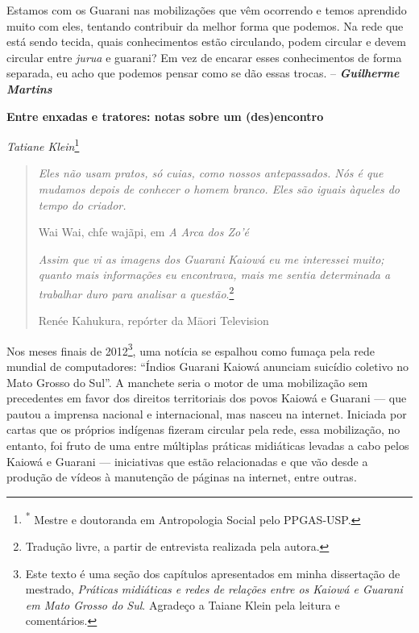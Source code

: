 Estamos com os Guarani nas mobilizações que vêm ocorrendo e temos
aprendido muito com eles, tentando contribuir da melhor forma que
podemos. Na rede que está sendo tecida, quais conhecimentos estão
circulando, podem circular e devem circular entre \emph{jurua} e
guarani? Em vez de encarar esses conhecimentos de forma separada, eu
acho que podemos pensar como se dão essas trocas. --
\emph{\textbf{Guilherme Martins}}

\textbf{Entre enxadas e tratores: notas sobre um (des)encontro}

\emph{Tatiane Klein}\footnote{\textsuperscript{*} Mestre e doutoranda em
  Antropologia Social pelo PPGAS-USP.}

\begin{quote}
\emph{Eles não usam pratos, só cuias, como nossos antepassados. Nós é
que mudamos depois de conhecer o homem branco. Eles são iguais àqueles
do tempo do criador.}

Wai Wai, chfe wajãpi, em \emph{A Arca dos Zo'é}

\emph{Assim que vi as imagens dos Guarani Kaiowá eu me interessei muito;
quanto mais informações eu encontrava, mais me sentia determinada a
trabalhar duro para analisar a questão}.\footnote{Tradução livre, a
  partir de entrevista realizada pela autora.}

Renée Kahukura, repórter da Māori Television
\end{quote}

Nos meses finais de 2012\footnote{Este texto é uma seção dos capítulos
  apresentados em minha dissertação de mestrado, \emph{Práticas
  midiáticas e redes de relações entre os Kaiowá e Guarani em Mato
  Grosso do Sul}. Agradeço a Taiane Klein pela leitura e comentários.},
uma notícia se espalhou como fumaça pela rede mundial de computadores:
``Índios Guarani Kaiowá anunciam suicídio coletivo no Mato Grosso do
Sul''. A manchete seria o motor de uma mobilização sem precedentes em
favor dos direitos territoriais dos povos Kaiowá e Guarani --- que
pautou a imprensa nacional e internacional, mas nasceu na internet.
Iniciada por cartas que os próprios indígenas fizeram circular pela
rede, essa mobilização, no entanto, foi fruto de uma entre múltiplas
práticas midiáticas levadas a cabo pelos Kaiowá e Guarani ---
iniciativas que estão relacionadas e que vão desde a produção de vídeos
à manutenção de páginas na internet, entre outras.

